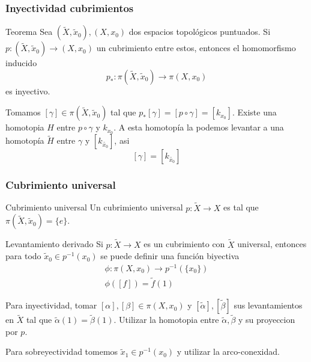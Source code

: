 \documentclass[xetex,mathserif,serif]{beamer}
\begin{document}
  \begin{frame}
    \frametitle{Inyectividad cubrimientos}
    \begin{block}{Teorema}
      Sea \(\left( \tilde X, \tilde x_0 \right), \left( X, x_0 \right)\)
      dos espacios topológicos puntuados. Si \(p : \left( \tilde X,
        \tilde x_0 \right) \to \left( X, x_0 \right)\) un cubrimiento
      entre estos, entonces el homomorfismo inducido
      \[ p_* : \pi \left( \tilde X, \tilde x_0 \right) \longrightarrow
        \pi \left( X, x_0 \right)\] es inyectivo.
    \end{block}
    \pause
    \begin{block}{}
      Tomamos \([\gamma] \in \pi(\tilde X, \tilde x_0)\) tal que \(p_*
      [\gamma] = [p \circ \gamma] = [k_{x_0}]\). Existe una homotopia
      \(H\) entre \(p \circ \gamma\) y \(k_{x_0}\). A esta homotopía la
      podemos levantar a una homotopía \(\tilde H\) entre \(\gamma\) y
      \([k_{\tilde {x_0}}]\), asi
      \[ [\gamma]= [k_{\tilde {x_0}}]\]
    \end{block}
  \end{frame}

  \begin{frame}
    \frametitle{Cubrimiento universal}
    \begin{block}{Cubrimiento universal}
      Un cubrimiento universal \(p : \tilde X \to X\) es tal que \(\pi
      (\tilde X, \tilde x_0) = \{e\}\).
    \end{block}

    \begin{block}{Levantamiento derivado}
      Si \(p : \tilde X \to X\) es un cubrimiento con \(\tilde X\)
      universal, entonces para todo \(\tilde x_0 \in p^{-1} (x_0)\) se
      puede definir una función biyectiva
      \begin{gather*}
         \phi : \pi (X, x_0) \to p^{-1} (\{x_0\}) \\
         \phi \left( [f] \right) = \tilde f (1)
      \end{gather*}

      \pause
      Para inyectividad, tomar \([\alpha],[\beta] \in \pi (X, x_0)\) y
      \([\tilde \alpha], [\tilde \beta]\) sus levantamientos en \(\tilde
      X\) tal que \(\tilde \alpha (1) = \tilde \beta (1)\). Utilizar la
      homotopia entre \(\tilde \alpha, \tilde \beta\) y su proyeccion
      por \(p\).

      Para sobreyectividad tomemos \(\tilde x_1 \in p^{-1} (x_0)\) y
      utilizar la arco-conexidad.
    \end{block}
  \end{frame}
\end{document}
